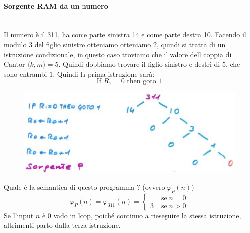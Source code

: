 \documentclass{article}
\begin{document}
\paragraph{Sorgente RAM da un numero}\mbox{}\\
Il numero è il 311, ha come parte sinistra 14 e come parte destra 10. Facendo il modulo 3
del figlio sinistro otteniamo otteniamo 2, quindi si tratta di un istruzione condizionale,
in questo caso troviamo che il valore dell coppia di Cantor $\langle k,m\rangle = 5$. Quindi
dobbiamo trovare il figlio sinistro e destri di $5$, che sono entrambi $1$. Quindi
la prima istruzione sarà:
$$\text{If }R_1=0\text{ then goto }1$$
\begin{figure}[H]
    \centering
    \includegraphics[scale=0.5]{images/sorgente_p.png}

\end{figure}
Quale é la semantica di questo programma ? (ovvero $\varphi_P(n)$)
\[
    \varphi_P(n)=\varphi_{311}(n)=
    \begin{cases}
        \bot & \text{se }n=0 \\
        3    & \text{se }n>0
    \end{cases}
\]
Se l'input $n$ è 0 vado in loop, poiché continuo a rieseguire la stessa istruzione,
altrimenti parto dalla terza istruzione.
\end{document}
